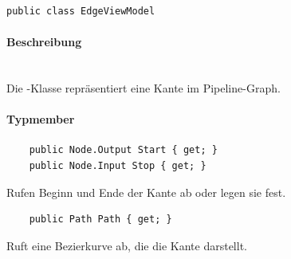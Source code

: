 \begin{verbatim}
public class EdgeViewModel
\end{verbatim}

\paragraph{Beschreibung}~\\
Die -Klasse repräsentiert eine Kante im Pipeline-Graph.

\paragraph{Typmember}
\begin{itemize}

	\begin{verbatim}
	public Node.Output Start { get; }
	public Node.Input Stop { get; }
	\end{verbatim}
	Rufen Beginn und Ende der Kante ab oder legen sie fest.

	\begin{verbatim}
	public Path Path { get; }
	\end{verbatim}
	Ruft eine Bezierkurve ab, die die Kante darstellt.

\end{itemize}
